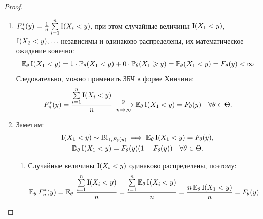 \begin{proof}\leavevmode
    \begin{enumerate}
        \item 
            $F_{n}^{*}(y)=\frac{1}{n} \sum\limits_{i=1}^{n} \Ind(X_{i}<y)$, при этом случайные величины $\Ind(X_{1}<y)$, $\Ind(X_{2}<y), \ldots$ независимы и одинаково распределены, их математическое ожидание конечно:
            \begin{equation*}
                \ExpTh \Ind(X_{1}<y)=1 \cdot \MyPrTh (X_{1}<y)+0 \cdot \MyPrTh (X_{1} \geqslant y) = \MyPrTh (X_{1}<y)=F_{\theta}(y) < \infty
            \end{equation*}
            Следовательно, можно применить ЗБЧ в форме Хинчина:
            \begin{equation*}
                F_{n}^{*}(y)=\frac{\sum\limits_{i=1}^{n} \Ind(X_{i}<y)}{n} \xrightarrow[n \to \infty]{\text{p}} \ExpTh \Ind(X_{1}<y)=F_{\theta}(y) \quad \AllTh.
            \end{equation*}
        \item 
            Заметим:
            \begin{gather*}
                \Ind(X_{1}<y) \sim  \Binom_{1, F_{\theta}(y)} \implies \ExpTh \Ind(X_{1}<y) = F_{\theta}(y), \\
                \VarTh \Ind(X_{1}<y) = F_{\theta}(y)(1-F_{\theta}(y)) \quad \AllTh.
            \end{gather*}
            \begin{enumerate}[label={\arabic*)}]
                \item Случайные величины $\Ind(X_{i}<y)$ одинаково распределены, поэтому:
                \begin{equation*}
                    \ExpTh F_{n}^{*}(y) = \ExpTh \, \frac{\sum\limits_{i=1}^{n} \Ind(X_{i}<y)}{n} =\frac{\sum\limits_{i=1}^{n} \ExpTh \Ind(X_{i}<y)}{n}=\frac{n \ExpTh \Ind(X_{1}<y)}{n}=F_{\theta}(y)  
                \end{equation*}
                

\end{enumerate}
\end{enumerate}
\end{proof}
